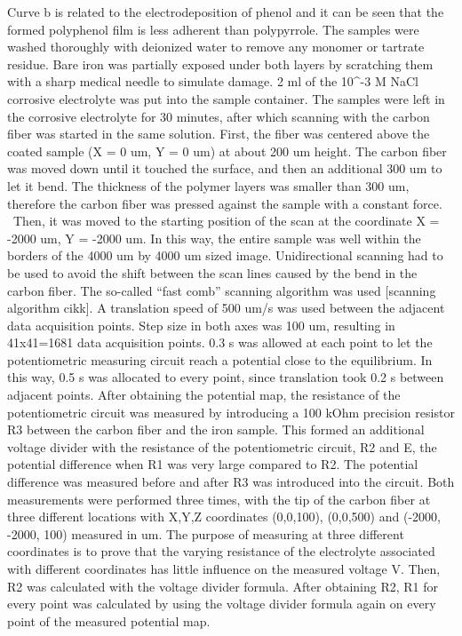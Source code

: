 \documentclass[3p]{elsarticle}
\begin{document}
Curve b is related to the electrodeposition of phenol and it can be seen that the formed polyphenol film is less adherent than polypyrrole. The samples were washed thoroughly with deionized water to remove any monomer or tartrate residue. Bare iron was partially exposed under both layers by scratching them with a sharp medical needle to simulate damage. 2 ml of the 10^-3 M NaCl corrosive electrolyte was put into the sample container. The samples were left in the corrosive electrolyte for 30 minutes, after which scanning with the carbon fiber was started in the same solution. First, the fiber was centered above the coated sample (X = 0 um, Y = 0 um) at about 200 um height. The carbon fiber was moved down until it touched the surface, and then an additional 300 um to let it bend. The thickness of the polymer layers was smaller than 300 um, therefore the carbon fiber was pressed against the sample with a constant force.  Then, it was moved to the starting position of the scan at the coordinate X = -2000 um, Y = -2000 um. In this way, the entire sample was well within the borders of the 4000 um by 4000 um sized image. Unidirectional scanning had to be used to avoid the shift between the scan lines caused by the bend in the carbon fiber. The so-called “fast comb” scanning algorithm was used [scanning algorithm cikk]. A translation speed of 500 um/s was used between the adjacent data acquisition points. Step size in both axes was 100 um, resulting in 41x41=1681 data acquisition points. 0.3 s was allowed at each point to let the potentiometric measuring circuit reach a potential close to the equilibrium. In this way, 0.5 s was allocated to every point, since translation took 0.2 s between adjacent points. After obtaining the potential map, the resistance of the potentiometric circuit was measured by introducing a 100 kOhm precision resistor R3 between the carbon fiber and the iron sample. This formed an additional voltage divider with the resistance of the potentiometric circuit, R2 and E, the potential difference when R1 was very large compared to R2. The potential difference was measured before and after R3 was introduced into the circuit. Both measurements were performed three times, with the tip of the carbon fiber at three different locations with X,Y,Z coordinates (0,0,100), (0,0,500) and (-2000, -2000, 100) measured in um. The purpose of measuring at three different coordinates is to prove that the varying resistance of the electrolyte associated with different coordinates has little influence on the measured voltage V. Then, R2 was calculated with the voltage divider formula. After obtaining R2, R1 for every point was calculated by using the voltage divider formula again on every point of the measured potential map.
\end{document}
